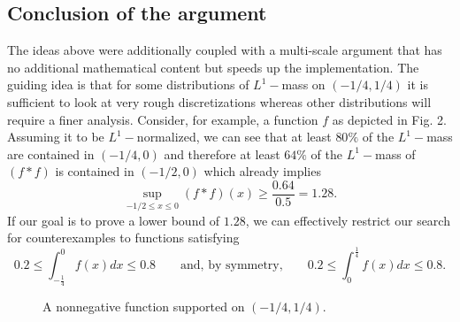 \documentclass[10pt]{amsart}
\begin{document}
\subsection{Conclusion of the argument} 
The ideas above were additionally coupled with a multi-scale argument that has no additional mathematical content but speeds up the implementation. The guiding idea is that for some distributions of $L^1-$mass on $(-1/4,1/4)$ it is sufficient to look at very rough discretizations
whereas other distributions will require a finer analysis. Consider, for example, a function $f$ as depicted in Fig. 2. Assuming it to be $L^1-$normalized, we can see that at least $80\%$ of the $L^1-$mass are contained in $(-1/4, 0)$ and therefore at
least $64\%$ of the $L^1-$mass of $(f*f)$ is contained in $(-1/2, 0)$ which already implies
$$ \sup_{-1/2 \leq x \leq 0}{(f*f)(x)} \geq \frac{0.64}{0.5} = 1.28.$$
If our goal is to prove a lower bound of $1.28$, we can effectively restrict our search for counterexamples to functions satisfying
$$ 0.2 \leq \int_{-\frac{1}{4}}^{0}{f(x)dx} \leq 0.8 \qquad \mbox{and, by symmetry,} \qquad 0.2 \leq \int_{0}^{\frac{1}{4}}{f(x)dx} \leq 0.8.$$
\begin{figure}[h!]
\caption{A nonnegative function supported on $(-1/4,1/4)$.}
\end{figure}
\end{document}
